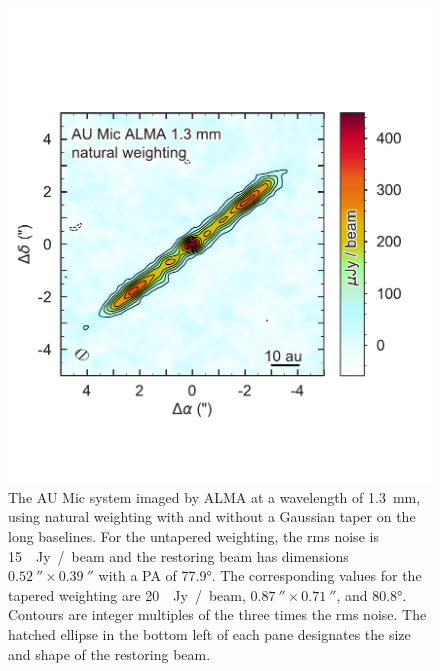\documentclass[12pt,oneside]{book}
\begin{document}
\begin{figure}
  \includegraphics[width=\linewidth]{../figures/aumic_imaged}
  \caption{The AU Mic system imaged by ALMA at a wavelength of \SI{1.3}{mm}, using natural weighting with and without a Gaussian taper on the long baselines. 
  For the untapered weighting, the rms noise is \SI{15}{\mu Jy / beam} and the restoring beam has dimensions $\SI{0.52}{\arcsecond} \times \SI{0.39}{\arcsecond}$ with a PA of \ang[angle-symbol-over-decimal]{77.9}.
  The corresponding values for the tapered weighting are \SI{20}{\mu Jy / beam}, $\SI{0.87}{\arcsecond} \times \SI{0.71}{\arcsecond}$, and \ang[angle-symbol-over-decimal]{80.8}. 
  Contours are integer multiples of the three times the rms noise.
  The hatched ellipse in the bottom left of each pane designates the size and shape of the restoring beam.
  }
  \label{fig: aumic_imaged}
\end{figure}
\end{document}
